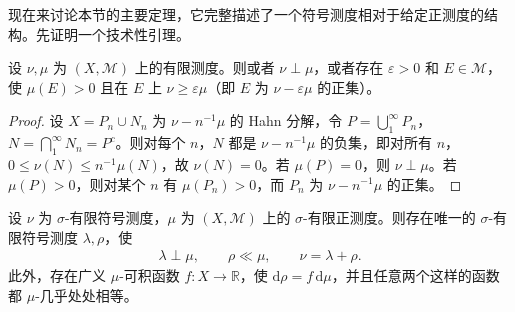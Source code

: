 \documentclass[../../main.tex]{subfiles}%
\begin{document}
现在来讨论本节的主要定理，它完整描述了一个符号测度相对于给定正测度的结构。先证明一个技术性引理。
\begin{lemma}\label{lemma:ch03-positive-domination}
设 $\nu,\mu$ 为 $(X,\mathscr{M})$ 上的有限测度。则或者 $\nu\perp\mu$，或者存在 $\varepsilon>0$ 和 $E\in\mathscr{M}$，使 $\mu(E)>0$ 且在 $E$ 上 $\nu\ge\varepsilon\mu$（即 $E$ 为 $\nu-\varepsilon\mu$ 的正集）。
\end{lemma}
\begin{proof}
设 $X=P_n\cup N_n$ 为 $\nu-n^{-1}\mu$ 的 Hahn 分解，令 $P=\bigcup_1^\infty P_n$，$N=\bigcap_1^\infty N_n=P^c$。则对每个 $n$，$N$ 都是 $\nu-n^{-1}\mu$ 的负集，即对所有 $n$，$0\le\nu(N)\le n^{-1}\mu(N)$，故 $\nu(N)=0$。若 $\mu(P)=0$，则 $\nu\perp\mu$。若 $\mu(P)>0$，则对某个 $n$ 有 $\mu(P_n)>0$，而 $P_n$ 为 $\nu-n^{-1}\mu$ 的正集。
\end{proof}
\begin{theorem}\label{theorem:ch03-lebesgue-radon-nikodym}
设 $\nu$ 为 $\sigma$-有限符号测度，$\mu$ 为 $(X,\mathscr{M})$ 上的 $\sigma$-有限正测度。则存在唯一的 $\sigma$-有限符号测度 $\lambda,\rho$，使
\begin{align*}
\lambda\perp\mu,\qquad \rho\ll\mu,\qquad \nu=\lambda+\rho.
\end{align*}
此外，存在广义 $\mu$-可积函数 $f:X\to\mathbb{R}$，使 $\mathrm{d}\rho=f\,\mathrm{d}\mu$，并且任意两个这样的函数都 $\mu$-几乎处处相等。
\end{theorem}
\end{document}
